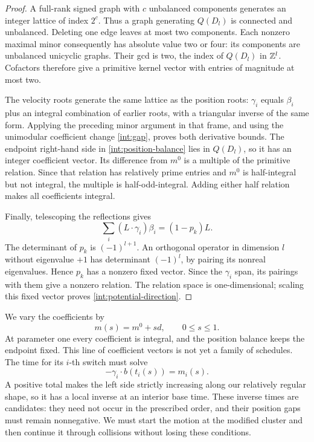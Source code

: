 \begin{proof}
A full-rank signed graph with \(c\) unbalanced components generates an
integer lattice of index \(2^c\).  Thus a graph generating \(Q(D_l)\)
is connected and unbalanced.  Deleting one edge leaves at most two
components.  Each nonzero maximal minor consequently has absolute
value two or four: its components are unbalanced unicyclic graphs.
Their gcd is two, the index of \(Q(D_l)\) in \(\mathbb Z^l\).  Cofactors
therefore give a primitive kernel vector with entries of magnitude at
most two.

The velocity roots generate the same lattice as the position roots:
\(\gamma_i\) equals \(\beta_i\) plus an integral combination of earlier
roots, with a triangular inverse of the same form.  Applying the
preceding minor argument in that frame, and using the unimodular
coefficient change \eqref{int:gap}, proves both derivative bounds.
The endpoint right-hand side in \eqref{int:position-balance} lies in
\(Q(D_l)\), so it has an integer coefficient vector.  Its difference
from \(m^0\) is a multiple of the primitive relation.  Since that
relation has relatively prime entries and \(m^0\) is half-integral but
not integral, the multiple is half-odd-integral.  Adding either half
relation makes all coefficients integral.

Finally, telescoping the reflections gives
\begin{equation}\label{int:telescoping}
 \sum_i (L\cdot\gamma_i)\beta_i=(1-p_k)L.
\end{equation}
The determinant of \(p_k\) is \((-1)^{l+1}\).  An orthogonal operator
in dimension \(l\) without eigenvalue \(+1\) has determinant
\((-1)^l\), by pairing its nonreal eigenvalues.  Hence \(p_k\) has a
nonzero fixed vector.  Since the \(\gamma_i\) span, its pairings with
them give a nonzero relation.  The relation space is one-dimensional;
scaling this fixed vector proves \eqref{int:potential-direction}.
\end{proof}

We vary the coefficients by
\begin{equation}\label{int:interpolation}
 m(s)=m^0+s d,\qquad 0\le s\le1.
\end{equation}
At parameter one every coefficient is integral, and the position
balance keeps the endpoint fixed.  This line of coefficient vectors
is not yet a family of schedules.  The time for its \(i\)-th switch
must solve
\[
 -\gamma_i\cdot b(t_i(s))=m_i(s).
\]
A positive total makes the left side strictly increasing along our
relatively regular shape, so it has a local inverse at an interior
base time.  These inverse times are candidates: they need not occur
in the prescribed order, and their position gaps must remain
nonnegative.  We must start the motion at the modified cluster and
then continue it through collisions without losing these conditions.


